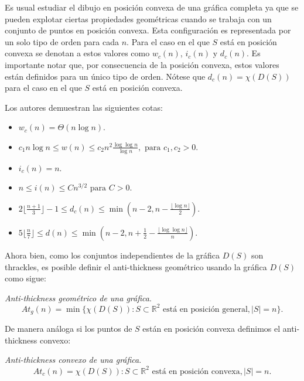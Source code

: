 Es usual estudiar el dibujo en posición convexa de una gráfica completa ya que
se pueden explotar ciertas propiedades geométricas cuando se trabaja con un
conjunto de puntos en posición convexa. Esta configuración es representada por
un solo tipo de orden para cada $n$. Para el caso en el que $S$ está en
posición convexa se denotan a estos valores como $w_c(n)$, $i_c(n)$ y $d_c(n)$.
Es importante notar que, por consecuencia de la posición convexa, estos valores
están definidos para un único tipo de orden. Nótese que $d_c(n)=\chi(D(S))$ para
el caso en el que $S$ está en posición convexa.

Los autores demuestran las siguientes cotas:
\begin{itemize}
  \item $w_c(n) = \Theta(n\log n)$.
  \item $c_1n\log n \leq w(n) \leq c_2 n^2 \frac{\log\log n}{\log n}, \text{ para } c_1,c_2 > 0$.
  \item $i_c(n) = n$.
  \item $n \leq i(n) \leq Cn^{3/2} \text{ para } C > 0$.
  \item $2\lfloor \frac{n+1}{3}\rfloor -1 \leq d_c(n) \leq \min\left( n-2, n - \frac{\lfloor{\log n}\rfloor}{2}\right)$.
  \item $5\lfloor \frac{n}{7}\rfloor \leq d(n) \leq \min\left(n-2,n+\frac{1}{2}- \frac{\lfloor{\log \log n}\rfloor}{n}\right)$.
\end{itemize}

Ahora bien, como los conjuntos independientes de la gráfica $D(S)$ son
thrackles, es posible definir el anti-thickness geométrico usando la gráfica
$D(S)$ como sigue:
\begin{definition}{\emph{Anti-thickness geométrico de una gráfica}.}
  \[At_g(n) = \min\{\chi(D(S)): S\subset \mathbb{R}^2 \text{ está en posición general}, |S|=n\}.\]
\end{definition}

De manera análoga si los puntos de $S$ están en posición convexa definimos el
anti-thickness convexo:

\begin{definition}{\emph{Anti-thickness convexo de una gráfica}.}
  \[At_c(n) = \chi(D(S)): S\subset \mathbb{R}^2 \text{ está en posición convexa}, |S|=n.\]
\end{definition}

